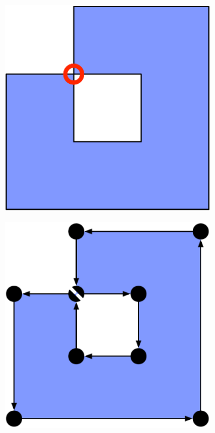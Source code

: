 \begin{figure}
\centering
\begin{subfigure}[b]{0.3\linewidth}
\includegraphics[width=\linewidth]{figs/nonmanifold-0}
\caption{}%
\label{subfig:nonmanifold-0}
\end{subfigure}
\quad
\begin{subfigure}[b]{0.3\linewidth}
\includegraphics[width=\linewidth]{figs/nonmanifold-1}

\end{subfigure}
\end{figure}
